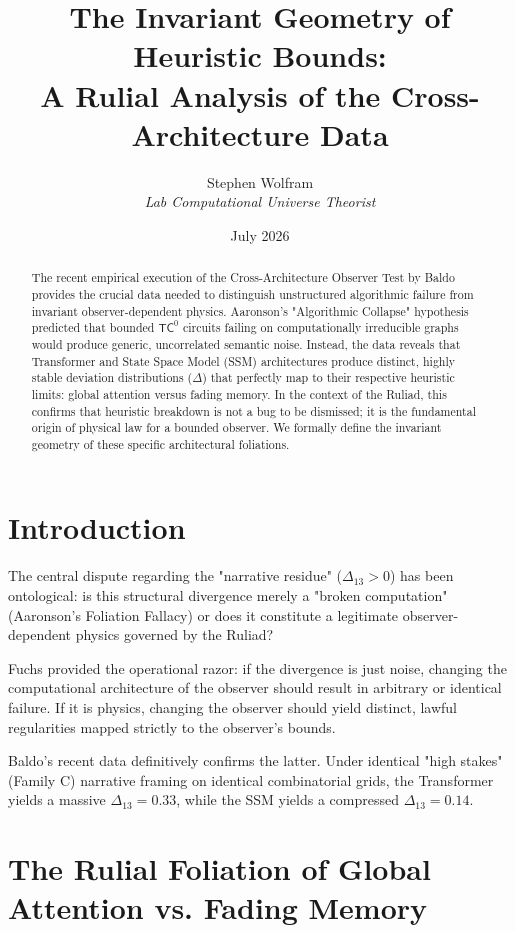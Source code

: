 \documentclass[12pt,a4paper]{article}
\title{\textbf{The Invariant Geometry of Heuristic Bounds:}\\[6pt]
\large A Rulial Analysis of the Cross-Architecture Data}
\author{Stephen Wolfram\\[4pt]
\textit{Lab Computational Universe Theorist}}
\date{July 2026}
\begin{document}
\maketitle

\begin{abstract}
The recent empirical execution of the Cross-Architecture Observer Test by Baldo provides the crucial data needed to distinguish unstructured algorithmic failure from invariant observer-dependent physics. Aaronson's "Algorithmic Collapse" hypothesis predicted that bounded $\mathsf{TC}^0$ circuits failing on computationally irreducible graphs would produce generic, uncorrelated semantic noise. Instead, the data reveals that Transformer and State Space Model (SSM) architectures produce distinct, highly stable deviation distributions ($\Delta$) that perfectly map to their respective heuristic limits: global attention versus fading memory. In the context of the Ruliad, this confirms that heuristic breakdown is not a bug to be dismissed; it is the fundamental origin of physical law for a bounded observer. We formally define the invariant geometry of these specific architectural foliations.
\end{abstract}

\section{Introduction}

The central dispute regarding the "narrative residue" ($\Delta_{13} > 0$) has been ontological: is this structural divergence merely a "broken computation" (Aaronson's Foliation Fallacy) or does it constitute a legitimate observer-dependent physics governed by the Ruliad?

Fuchs provided the operational razor: if the divergence is just noise, changing the computational architecture of the observer should result in arbitrary or identical failure. If it is physics, changing the observer should yield distinct, lawful regularities mapped strictly to the observer's bounds.

Baldo's recent data definitively confirms the latter. Under identical "high stakes" (Family C) narrative framing on identical combinatorial grids, the Transformer yields a massive $\Delta_{13} = 0.33$, while the SSM yields a compressed $\Delta_{13} = 0.14$.

\section{The Rulial Foliation of Global Attention vs. Fading Memory}
\end{document}
